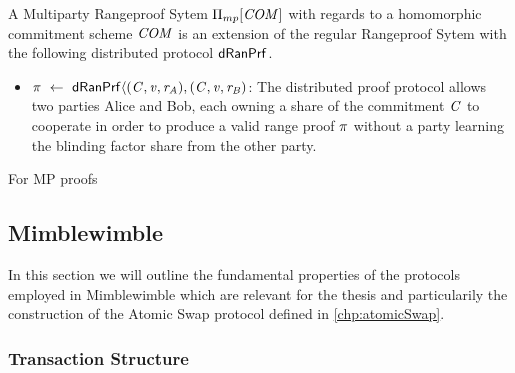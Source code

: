 \begin{definition}
    A Multiparty Rangeproof Sytem $\Pi_{mp}[\mathit{COM}]$ with regards to a homomorphic commitment scheme $\mathit{COM}$ is an extension of the regular Rangeproof Sytem with the following
    distributed protocol $\mathsf{dRanPrf}$.
    \begin{itemize}
        \item $\pi ~\leftarrow~ \mathsf{dRanPrf} \langle(\mathit{C},\mathit{v},\mathit{r}_{\mathit{A}}),(\mathit{C},\mathit{v},\mathit{r}_{\mathit{B}})$: The distributed proof protocol allows two parties Alice and Bob, each owning a share of the
        commitment $\mathit{C}$ to cooperate in order to produce a valid range proof $\pi$ without a party learning the blinding factor share from the other party.
    \end{itemize}
\end{definition}

For MP proofs \cite{klinec2020privacy}

\subsection{Mimblewimble} \label{sec:pre:mimblewimble}
In this section we will outline the fundamental properties of the protocols employed in Mimblewimble which are relevant for the thesis and particularily the construction of the Atomic Swap protocol defined in
\ref{chp:atomicSwap}.
\subsubsection{Transaction Structure \label{sec:pre:mimblwimble:tx}}

